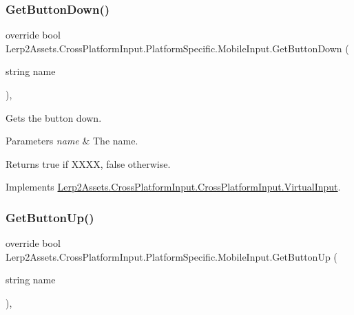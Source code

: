 \subsubsection{\texorpdfstring{Get\+Button\+Down()}{GetButtonDown()}}
{\footnotesize\ttfamily override bool Lerp2\+Assets.\+Cross\+Platform\+Input.\+Platform\+Specific.\+Mobile\+Input.\+Get\+Button\+Down (\begin{DoxyParamCaption}\item[{string}]{name }\end{DoxyParamCaption})\hspace{0.3cm}{\ttfamily [inline]}, {\ttfamily [virtual]}}



Gets the button down. 


\begin{DoxyParams}{Parameters}
{\em name} & The name.\\
\hline
\end{DoxyParams}
\begin{DoxyReturn}{Returns}
{\ttfamily true} if X\+X\+XX, {\ttfamily false} otherwise.
\end{DoxyReturn}


Implements \hyperlink{class_lerp2_assets_1_1_cross_platform_input_1_1_cross_platform_input_1_1_virtual_input_a0e032fff9d6abc32017cee10d69d32d4}{Lerp2\+Assets.\+Cross\+Platform\+Input.\+Cross\+Platform\+Input.\+Virtual\+Input}.

\mbox{\label{class_lerp2_assets_1_1_cross_platform_input_1_1_platform_specific_1_1_mobile_input_ad3aa10ec9452a308cca46d418be0995d}} 
\subsubsection{\texorpdfstring{Get\+Button\+Up()}{GetButtonUp()}}
{\footnotesize\ttfamily override bool Lerp2\+Assets.\+Cross\+Platform\+Input.\+Platform\+Specific.\+Mobile\+Input.\+Get\+Button\+Up (\begin{DoxyParamCaption}\item[{string}]{name }\end{DoxyParamCaption})\hspace{0.3cm}{\ttfamily [inline]}, {\ttfamily [virtual]}}



